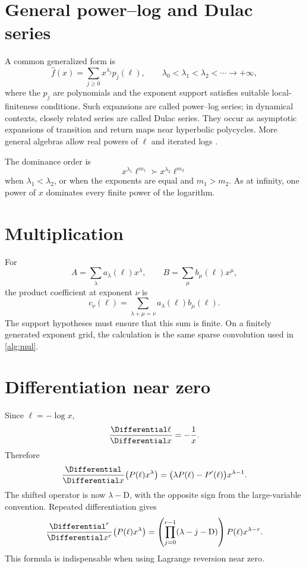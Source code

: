 \documentclass[11pt,openany]{book}
\theoremstyle{definition}
\theoremstyle{plain}
\theoremstyle{remark}
\newcommand{\Dop}{\mathrm{D}}
\newcommand{\DulacFormalSeriesOf}[1]{\widehat{#1}}
\begin{document}
\section{General power--log and Dulac series}
A common generalized form is
\begin{equation}\label{eq:Dulac-series}
 \DulacFormalSeriesOf{f}(x)=\sum_{j\ge0}x^{\lambda_j}p_j(\ell),
 \qquad
 \lambda_0<\lambda_1<\lambda_2<\cdots\to+\infty,
\end{equation}
where the \(p_j\) are polynomials and the exponent support satisfies suitable
local-finiteness conditions.  Such expansions are called power--log series; in
dynamical contexts, closely related series are called Dulac series.  They occur
as asymptotic expansions of transition and return maps near hyperbolic
polycycles.  More general algebras allow real powers of \(\ell\) and iterated
logs \cite{mardesic-powerlog,mardesic-dulac,peran-logarithmic}.

The dominance order is
\[
 x^{\lambda_1}\ell^{m_1}\succ x^{\lambda_2}\ell^{m_2}
\]
when \(\lambda_1<\lambda_2\), or when the exponents are equal and
\(m_1>m_2\).  As at infinity, one power of \(x\) dominates every finite power
of the logarithm.

\section{Multiplication}
For
\[
 A=\sum_\lambda a_\lambda(\ell)x^\lambda,
 \qquad
 B=\sum_\mu b_\mu(\ell)x^\mu,
\]
the product coefficient at exponent \(\nu\) is
\begin{equation}\label{eq:Dulac-product}
 c_\nu(\ell)=\sum_{\lambda+\mu=\nu}
 a_\lambda(\ell)b_\mu(\ell).
\end{equation}
The support hypotheses must ensure that this sum is finite.  On a finitely
generated exponent grid, the calculation is the same sparse convolution used
in \cref{alg:mul}.

\section{Differentiation near zero}
Since \(\ell=-\log x\),
\[
 \frac{\Differential\ell}{\Differential x}=-\frac1x.
\]
Therefore
\begin{equation}\label{eq:Dulac-derivative}
 \frac{\Differential}{\Differential x}\bigl(P(\ell)x^\lambda\bigr)
 =\bigl(\lambda P(\ell)-P'(\ell)\bigr)x^{\lambda-1}.
\end{equation}
The shifted operator is now \(\lambda-\Dop\), with the opposite sign from the
large-variable convention.  Repeated differentiation gives
\begin{equation}\label{eq:Dulac-repeated-derivative}
 \frac{\Differential^r}{\Differential x^r}\bigl(P(\ell)x^\lambda\bigr)
 =\left(\prod_{j=0}^{r-1}(\lambda-j-\Dop)\right)
 P(\ell)x^{\lambda-r}.
\end{equation}
This formula is indispensable when using Lagrange reversion near zero.
\end{document}
